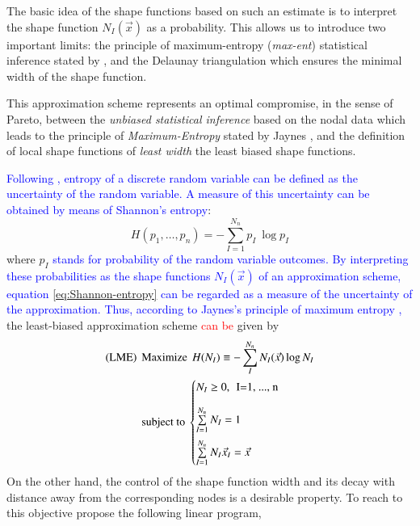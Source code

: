 \documentclass[preprint,12pt,a4paper]{elsarticle}
\begin{document}
The basic idea of the shape functions based on such an estimate is to interpret the shape function $N_I(\vec{x})$ as a probability. This allows us to introduce two important limits:
the principle of maximum-entropy (\textit{max-ent}) statistical
inference stated by \cite{Jaynes1957}, and the Delaunay triangulation
which ensures the minimal width of the shape function. 

This approximation scheme represents an optimal compromise, in the sense of
Pareto, between the \textit{unbiased statistical inference} based on
the nodal data which leads to the principle of \textit{Maximum-Entropy}
stated by Jaynes \cite{Jaynes1957}, and the definition of local shape
functions of \textit{least width} the least biased shape functions.

\textcolor{blue}{Following \cite{Arroyo2006}, entropy of a discrete random variable can be defined as the uncertainty of the random variable. A measure of this uncertainty can be obtained by means of Shannon's entropy}:
\begin{equation}
  \label{eq:Shannon-entropy}
  H(p_1,\ldots,p_n) = -\sum^{N_n}_{I=1}{p_I\ \log p_I }
\end{equation}
where $p_I$ \textcolor{blue}{stands for probability of the random variable outcomes. By interpreting these probabilities as the shape functions $N_I(\vec{x})$ of an approximation scheme, equation \eqref{eq:Shannon-entropy} can be regarded as a measure of the uncertainty of the approximation. Thus, according to Jaynes's principle of maximum entropy \cite{Jaynes1957},} the least-biased approximation scheme  \textcolor{red}{can be} given by
\begin{align*}
  \label{eq:least-biased-approximation-scheme}
  \text{(LME)} \hspace{0.15cm} &\text{Maximize} \hspace{0.15cm} H(N_I) \equiv
  -\sum_{I}^{N_n}{N_I(\vec{x})\log N_I }\\
  &\text{subject to}\
  \begin{cases}
    N_I \ge 0, \hspace{0.15cm} \text{I=1, ..., n} \\[1em]   
    \sum\limits_{I=1}^{N_n}{N_I} = 1 \\[1em]   
    \sum\limits_{I=1}^{N_n}{N_I \vec{x}_I} = \vec{x} \\
  \end{cases}
\end{align*}
On the other hand, the control of the shape function width and its
decay with distance away from the corresponding nodes is a desirable property. To reach to this objective \cite{Arroyo2006} propose the following linear program,
\end{document}
